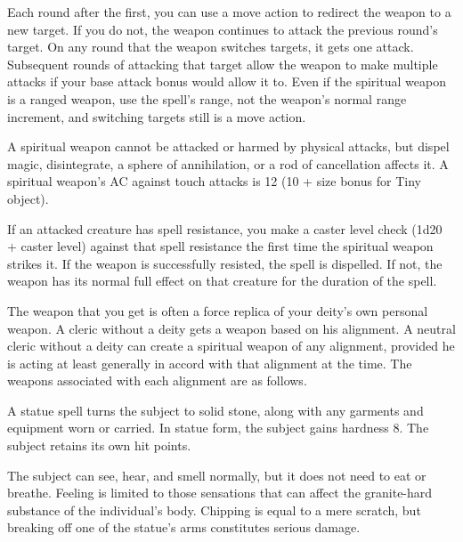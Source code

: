 \begin{multicols}{2}
\begin{small}
\smallskip\noindent Each round after the first, you can use a move action to redirect the weapon to a new target. If you do not, the weapon continues to attack the previous round's target. On any round that the weapon switches targets, it gets one attack. Subsequent rounds of attacking that target allow the weapon to make multiple attacks if your base attack bonus would allow it to. Even if the spiritual weapon is a ranged weapon, use the spell's range, not the weapon's normal range increment, and switching targets still is a move action.

\smallskip\noindent A spiritual weapon cannot be attacked or harmed by physical attacks, but dispel magic, disintegrate, a sphere of annihilation, or a rod of cancellation affects it. A spiritual weapon's AC against touch attacks is 12 (10 + size bonus for Tiny object).

\smallskip\noindent If an attacked creature has spell resistance, you make a caster level check (1d20 + caster level) against that spell resistance the first time the spiritual weapon strikes it. If the weapon is successfully resisted, the spell is dispelled. If not, the weapon has its normal full effect on that creature for the duration of the spell.

\smallskip\noindent The weapon that you get is often a force replica of your deity's own personal weapon. A cleric without a deity gets a weapon based on his alignment. A neutral cleric without a deity can create a spiritual weapon of any alignment, provided he is acting at least generally in accord with that alignment at the time. The weapons associated with each alignment are as follows.


\noindent A statue spell turns the subject to solid stone, along with any garments and equipment worn or carried. In statue form, the subject gains hardness 8. The subject retains its own hit points.

\smallskip\noindent The subject can see, hear, and smell normally, but it does not need to eat or breathe. Feeling is limited to those sensations that can affect the granite-hard substance of the individual's body. Chipping is equal to a mere scratch, but breaking off one of the statue's arms constitutes serious damage.


\end{small}
\end{multicols}
